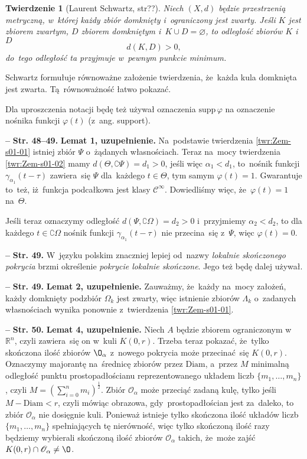 \documentclass[a4paper,11pt]{article}
\newtheorem{twr}{Twierdzenie}
\let\emptyset\varnothing
\newcommand{\ld}{\ldots}
\newcommand{\fr}{\frac}
\newcommand{\mr}{\mathrm}
\newcommand{\mb}{\mathbb}
\newcommand{\mc}{\mathcal}
\newcommand{\al}{\alpha}
\newcommand{\ga}{\gamma}
\newcommand{\La}{\Lambda}
\newcommand{\vp}{\varphi}
\newcommand{\Om}{\Omega}
\newcommand{\R}{\mb{R}}
\newcommand{\Rn}{\R^{ n }}
\newcommand{\Cc}{\mc{C}}
\newcommand{\Oc}{\mc{O}}
\newcommand{\es}{\emptyset}
\newcommand{\com}{\complement}
\newcommand{\Sum}{\sum\limits}
\newcommand{\Cinfty}{\Cc^{ \infty }}
\newcommand{\supp}{\mr{supp}\,}
\newcommand{\tb}{\textbf}
\newcommand{\noi}{\noindent}
\newcommand{\start}{\noi \tb{--} {}}
\newcommand{\Str}[1]{\tb{Str. #1.}}
\newcommand{\vpt}{\vp( t )}
\begin{document}
\begin{twr}[Laurent Schwartz, str??\cite{Sch79}]
  \label{twr:Zem-s01-02}
  Niech $( X, d )$ będzie przestrzenią metryczną, w~której każdy zbiór
  domknięty i~ograniczony jest zwarty. Jeśli $K$ jest zbiorem zwartym,
  $D$ zbiorem domkniętym i~$K \cup D = \es$, to odległość zbiorów $K$
  i~$D$
  \begin{equation}
    \label{eq:Zem-s01-05}
    d( K, D ) > 0,
  \end{equation}
  do~tego odległość ta przyjmuje w~pewnym punkcie minimum.
\end{twr}
\noi Schwartz formułuje równoważne założenie twierdzenia, że~każda
kula domknięta jest zwarta. Tą~równoważność łatwo pokazać.

Dla uproszczenia notacji będę też używał oznaczenia $\supp \vp$ na
oznaczenie nośnika funkcji $\vpt$ (z~ang. support).

\start \Str{48--49} \tb{Lemat 1, uzupełnienie.} Na~podstawie
twierdzenia \ref{twr:Zem-s01-01} istniej zbiór $\Psi$ o~żądanych
własnościach. Teraz na~mocy twierdzenia \eqref{twr:Zem-s01-02} mamy
$d( \Theta, \com \Psi ) = d_{ 1 } > 0$, jeśli więc
$\al_{ 1 } < d_{ 1 }$, to~nośnik funkcji
$\ga_{ \al_{ 1 } }( t - \tau )$ zawiera~się $\Psi$ dla~każdego
$t \in \Theta$, tym samym $\vp( t ) = 1$. Gwarantuje to~też,
iż~funkcja podcałkowa jest klasy $\Cinfty$. Dowiedliśmy więc,
że~$\vp( t ) = 1$ na~$\Theta$.

Jeśli teraz oznaczymy odległość $d( \Psi, \com \Om) = d_{ 2 } > 0$
i~przyjmiemy $\al_{ 2 } < d_{ 2 }$, to dla każdego $t \in \com \Om$
nośnik funkcji $\ga_{ \al_{ 1 } }( t - \tau )$ nie przecina~się
z~$\Psi$, więc $\vpt = 0$.

\start \Str{49} W~języku polskim znaczniej lepiej od~nazwy
\emph{lokalnie skończonego pokrycia} brzmi określenie \emph{pokrycie
  lokalnie skończone}. Jego też będę dalej używał.

\start \Str{49} \tb{Lemat 2, uzupełnienie.} Zauważmy, że~każdy na~mocy
założeń, każdy domknięty podzbiór $\Om_{ k }$ jest zwarty, więc
istnienie zbiorów $\La_{ k }$ o~zadanych własnościach wynika ponownie
z~twierdzenia \eqref{twr:Zem-s01-01}.

\start \Str{50} \tb{Lemat 4, uzupełnienie.} Niech $A$ będzie zbiorem
ograniczonym w~$\Rn$, czyli zawiera~się on w~kuli $K( 0, r )$. Trzeba
teraz pokazać, że~tylko skończona ilość zbiorów $\O_{ \al }$ z~nowego
pokrycia może przecinać~się $K( 0, r )$. Oznaczymy majorantę
na~średnicę zbiorów przez $\mr{Diam}$, a~przez $M$ minimalną odległość
punktu prostopadłościanu reprezentowanego układem liczb
$\{ m_{ 1 }, \ld, m_{ n } \}$, czyli
$M = \left( \Sum_{ i = 0 }^{ n } m_{ i } \right)^{ \fr{ 1 }{ 2 } }$.
Zbiór $\Oc_{ \al }$ może przeciąć zadaną kulę, tylko jeśli
$M - \mr{Diam} < r$, czyli mówiąc obrazowa, gdy~prostopadłościan jest
za~daleko, to zbiór $\Oc_{ \al }$ nie dosięgnie kuli. Ponieważ
istnieje tylko skończona ilość układów liczb
$\{ m_{ 1 }, \ld, m_{ n } \}$ spełniających tę nierówność, więc tylko
skończoną ilość razy będziemy wybierali skończoną ilość zbiorów
$\Oc_{ \al }$ takich, że~może zajść
$K( 0, r ) \cap \Oc_{ \al } \neq \O$.
\end{document}
